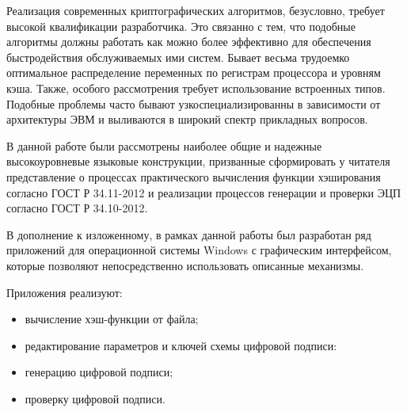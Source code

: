 \Conclusion %
\par
Реализация современных криптографических алгоритмов, безусловно, требует высокой квалификации разработчика. Это связанно с тем, что подобные алгоритмы должны работать как можно более эффективно для обеспечения быстродействия обслуживаемых ими систем. Бывает весьма трудоемко оптимальное распределение переменных по регистрам процессора и уровням кэша. Также, особого рассмотрения требует использование встроенных типов. Подобные проблемы часто бывают узкоспециализированны в зависимости от архитектуры ЭВМ и выливаются в широкий спектр прикладных вопросов.
\par
В данной работе были рассмотрены наиболее общие и надежные высокоуровневые языковые конструкции, призванные сформировать у читателя представление о процессах практического вычисления функции хэширования согласно ГОСТ Р 34.11-2012 и реализации процессов генерации и проверки ЭЦП согласно ГОСТ Р 34.10-2012.
\par
В дополнение к изложенному, в рамках данной работы был разработан ряд приложений для операционной системы Windows с графическим интерфейсом, которые позволяют непосредственно использовать описанные механизмы.
\par
Приложения реализуют:
\begin{itemize}
	\item вычисление хэш-функции от файла;
	\item редактирование параметров и ключей схемы цифровой подписи:
	\item генерацию цифровой подписи;
	\item проверку цифровой подписи.
\end{itemize}
